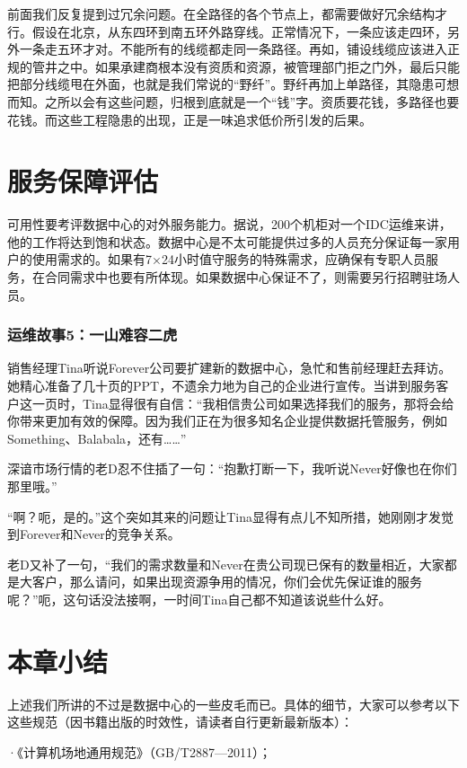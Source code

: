 \documentclass[12pt,UTF8]{ctexbook}
\begin{document}
前面我们反复提到过冗余问题。在全路径的各个节点上，都需要做好冗余结构才行。假设在北京，从东四环到南五环外路穿线。正常情况下，一条应该走四环，另外一条走五环才对。不能所有的线缆都走同一条路径。再如，铺设线缆应该进入正规的管井之中。如果承建商根本没有资质和资源，被管理部门拒之门外，最后只能把部分线缆甩在外面，也就是我们常说的“野纤”。野纤再加上单路径，其隐患可想而知。之所以会有这些问题，归根到底就是一个“钱”字。资质要花钱，多路径也要花钱。而这些工程隐患的出现，正是一味追求低价所引发的后果。

\section{服务保障评估}

可用性要考评数据中心的对外服务能力。据说，200个机柜对一个IDC运维来讲，他的工作将达到饱和状态。数据中心是不太可能提供过多的人员充分保证每一家用户的使用需求的。如果有7×24小时值守服务的特殊需求，应确保有专职人员服务，在合同需求中也要有所体现。如果数据中心保证不了，则需要另行招聘驻场人员。

\subsubsection{运维故事5：一山难容二虎}

销售经理Tina听说Forever公司要扩建新的数据中心，急忙和售前经理赶去拜访。她精心准备了几十页的PPT，不遗余力地为自己的企业进行宣传。当讲到服务客户这一页时，Tina显得很有自信：“我相信贵公司如果选择我们的服务，那将会给你带来更加有效的保障。因为我们正在为很多知名企业提供数据托管服务，例如Something、Balabala，还有……”

深谙市场行情的老D忍不住插了一句：“抱歉打断一下，我听说Never好像也在你们那里哦。”

“啊？呃，是的。”这个突如其来的问题让Tina显得有点儿不知所措，她刚刚才发觉到Forever和Never的竞争关系。

老D又补了一句，“我们的需求数量和Never在贵公司现已保有的数量相近，大家都是大客户，那么请问，如果出现资源争用的情况，你们会优先保证谁的服务呢？”呃，这句话没法接啊，一时间Tina自己都不知道该说些什么好。

\section{本章小结}

上述我们所讲的不过是数据中心的一些皮毛而已。具体的细节，大家可以参考以下这些规范（因书籍出版的时效性，请读者自行更新最新版本）：

·《计算机场地通用规范》（GB/T2887—2011）；
\end{document}
